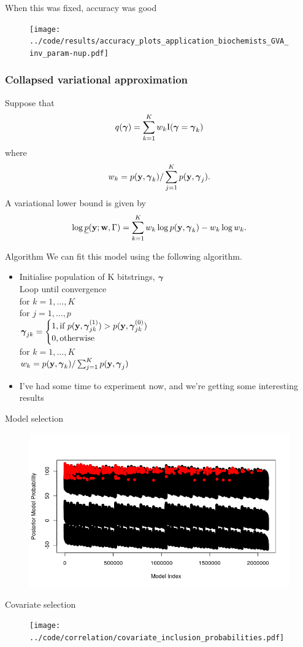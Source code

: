 \documentclass{beamer}
\begin{document}
\begin{frame}{When this was fixed, accuracy was good}
\begin{figure}
\texttt{[image: ../code/results/accuracy\_plots\_application\_biochemists\_GVA\_inv\_param-nup.pdf]}
\end{figure}
\end{frame}

\begin{frame}
\frametitle{Collapsed variational approximation}
Suppose that
\[
	q({\boldsymbol \gamma}) = \sum_{k=1}^K w_k \text{I}({\boldsymbol \gamma} = {\boldsymbol \gamma}_k)
\]
where
\[
	w_k = p({\bf y}, {\boldsymbol \gamma}_k) / \sum_{j=1}^K p({\bf y}, {\boldsymbol \gamma}_j).
\]
A variational lower bound is given by
\[
\log \underline{p}({\bf y}; {\bf w}, \Gamma) = \sum_{k=1}^K w_k \log p({\bf y}, {\boldsymbol \gamma}_k) - w_k \log w_k.
\]
\end{frame}

\begin{frame}{Algorithm}
We can fit this model using the following algorithm.
\begin{itemize}
\item Initialise population of K bitstrings, ${\boldsymbol \gamma}$ \\
Loop until convergence\\
\quad for $k = 1,  \ldots, K$\\
\quad \quad for $j = 1, \ldots, p$\\
\quad \quad \quad ${\boldsymbol \gamma}_{jk} = \begin{cases}
1, \text{if } p({\bf y}, {\boldsymbol \gamma}_{jk}^{(1)}) > p({\bf y}, {\boldsymbol \gamma}_{jk}^{(0)}) \\
0, \text{otherwise}
\end{cases}$\\
\quad for $k = 1, \ldots, K$\\
\quad \quad $w_k = p({\bf y}, {\boldsymbol \gamma}_k) / \sum_{j=1}^K p({\bf y}, {\boldsymbol \gamma}_j)$
\item I've had some time to experiment now, and we're getting some interesting results
\end{itemize}
\end{frame}

\begin{frame}{Model selection}

\begin{figure}
\includegraphics[scale=0.45]{../code/correlation/cva_more_dimensions.png}
\end{figure}
\end{frame}

\begin{frame}{Covariate selection}
\begin{figure}
\texttt{[image: ../code/correlation/covariate\_inclusion\_probabilities.pdf]}
\end{figure}
\end{frame}
\end{document}
